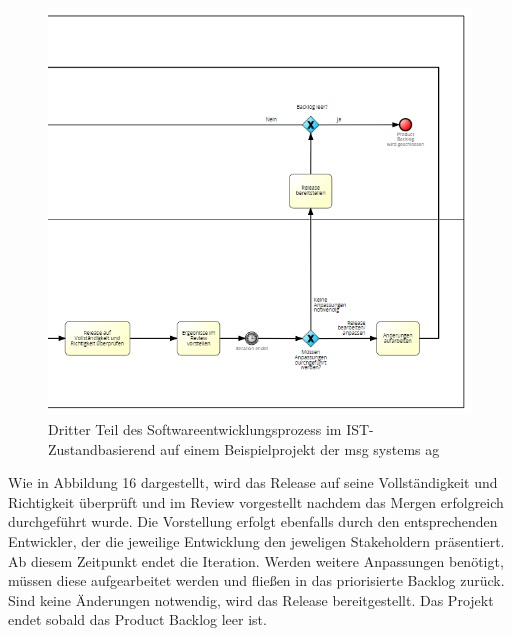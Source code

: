 \begin{figure}[h]
    \centering
    \includegraphics[scale=0.5]{Bilder/IST-Prozess_third Part.png}
    \caption{Dritter Teil des Softwareentwicklungsprozess im IST-Zustandbasierend auf einem Beispielprojekt der msg systems ag}
\end{figure}

\newpage
Wie in Abbildung 16 dargestellt, wird das Release auf seine Vollständigkeit und Richtigkeit überprüft und im Review vorgestellt nachdem das Mergen erfolgreich durchgeführt wurde. Die Vorstellung erfolgt ebenfalls durch den entsprechenden Entwickler, der die jeweilige Entwicklung den jeweligen Stakeholdern präsentiert. Ab diesem Zeitpunkt endet die Iteration. Werden weitere Anpassungen benötigt, müssen diese aufgearbeitet werden und fließen in das priorisierte Backlog zurück. Sind keine Änderungen notwendig, wird das Release bereitgestellt. Das Projekt endet sobald das Product Backlog leer ist.




